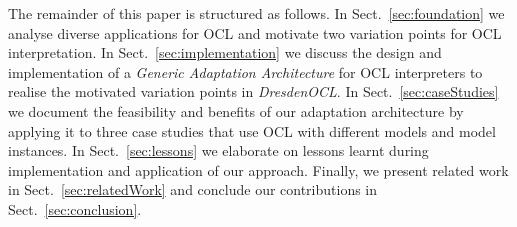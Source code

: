 	The remainder of this paper is structured as follows. In
	Sect.~\ref{sec:foundation} we analyse diverse applications for OCL and 
	motivate two variation points for OCL interpretation. In
	Sect.~\ref{sec:implementation} we discuss the design and implementation of a
	\emph{Generic Adaptation Architecture} for OCL interpreters to realise the
	motivated variation points in \emph{DresdenOCL}. In Sect.~\ref{sec:caseStudies}
	we document the feasibility and	benefits of our adaptation architecture by
	applying it to three case studies that use OCL with different models and model
	instances. In Sect.~\ref{sec:lessons} we elaborate on lessons learnt
	during implementation and application of our approach. Finally, we present
	related work in Sect.~\ref{sec:relatedWork} and conclude our contributions in
	Sect.~\ref{sec:conclusion}.
	
	

	

